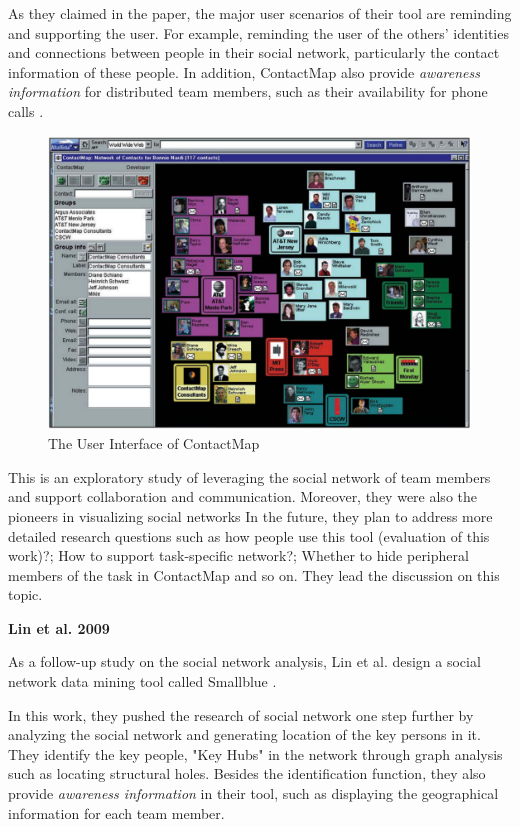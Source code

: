 As they claimed in the paper, the major user scenarios of their tool are reminding and supporting the user. For example, reminding the user of the others' identities and connections between people in their social network, particularly the contact information of these people. In addition, ContactMap also provide \textit{awareness information} for distributed team members, such as their availability for phone calls \cite{dourish1992awareness}.

\begin{figure}
\includegraphics[width = 1\columnwidth]{ContactMap.png}
\centering
\caption{The User Interface of ContactMap \cite{nardi2002integrating}}
\label{ContactMap}
\end{figure}

This is an exploratory study of leveraging the social network of team members and support collaboration and communication. Moreover, they were also the pioneers in visualizing social networks  In the future, they plan to address more detailed research questions such as how people use this tool (evaluation of this work)?; How to support task-specific network?; Whether to hide peripheral members of the task in ContactMap and so on. They lead the discussion on this topic.

\textbf{Lin et al. 2009}

As a follow-up study on the social network analysis, Lin et al. design a social network data mining tool called Smallblue \cite{lin2009smallblue}.

In this work, they pushed the research of social network one step further by analyzing the social network and generating location of the key persons in it. They identify the key people, "Key Hubs" in the network through graph analysis such as locating structural holes. Besides the identification function, they also provide \textit{awareness information} in their tool, such as displaying the geographical information for each team member.

